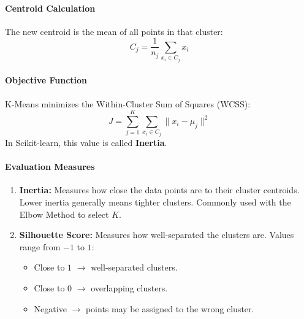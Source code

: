 \documentclass[a4paper,11pt]{article}
\begin{document}
\paragraph{Centroid Calculation}
The new centroid is the mean of all points in that cluster:
\[
C_j = \frac{1}{n_j} \sum_{x_i \in C_j} x_i
\]

\paragraph{Objective Function}
K-Means minimizes the Within-Cluster Sum of Squares (WCSS):
\[
J = \sum_{j=1}^{K} \sum_{x_i \in C_j} \| x_i - \mu_j \|^2
\]
In Scikit-learn, this value is called \textbf{Inertia}.

\paragraph{Evaluation Measures}
\begin{enumerate}
    \item \textbf{Inertia:} Measures how close the data points are to their cluster centroids. Lower inertia generally means tighter clusters. Commonly used with the Elbow Method to select $K$.
    \item \textbf{Silhouette Score:} Measures how well-separated the clusters are. Values range from $-1$ to $1$:
    \begin{itemize}
        \item Close to $1$ $\rightarrow$ well-separated clusters.
        \item Close to $0$ $\rightarrow$ overlapping clusters.
        \item Negative $\rightarrow$ points may be assigned to the wrong cluster.
    \end{itemize}
\end{enumerate}
\end{document}
